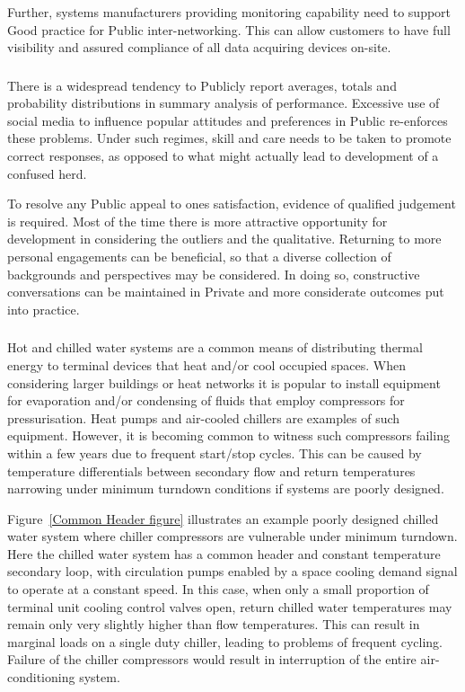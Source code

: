 \documentclass[11pt, oneside]{book}   	%
\begin{document}
Further, systems manufacturers providing monitoring capability need to support Good practice for Public inter-networking.
This can allow customers to have full visibility and assured compliance of all data acquiring devices on-site.\

\subsubsection{\color{Red}{P1: Social Media and Influencing the Averages}}
There is a widespread tendency to Publicly report averages, totals and probability distributions in summary analysis of performance.
Excessive use of social media to influence popular attitudes and preferences in Public re-enforces these problems.
Under such regimes, skill and care needs to be taken to promote correct responses, as opposed to what might actually lead to development of a confused herd.\

To resolve any Public appeal to ones satisfaction, evidence of qualified judgement is required.
Most of the time there is more attractive opportunity for development in considering the outliers and the qualitative.
Returning to more personal engagements can be beneficial, so that a diverse collection of backgrounds and perspectives may be considered.
In doing so, constructive conversations can be maintained in Private and more considerate outcomes put into practice.\

\subsubsection{\color{Red}{P1: Compressor Failures under Minimum Turndown}}
Hot and chilled water systems are a common means of distributing thermal energy to terminal devices that heat and/or cool occupied spaces.
When considering larger buildings or heat networks it is popular to install equipment for evaporation and/or condensing of fluids that employ compressors for pressurisation.
Heat pumps and air-cooled chillers are examples of such equipment.
However, it is becoming common to witness such compressors failing within a few years due to frequent start/stop cycles.
This can be caused by temperature differentials between secondary flow and return temperatures narrowing under minimum turndown conditions if systems are poorly designed.\

Figure~\ref{Common Header figure} illustrates an example poorly designed chilled water system where chiller compressors are vulnerable under minimum turndown.
Here the chilled water system has a common header and constant temperature secondary loop, with circulation pumps enabled by a space cooling demand signal to operate at a constant speed.
In this case, when only a small proportion of terminal unit cooling control valves open, return chilled water temperatures may remain only very slightly higher than flow temperatures.
This can result in marginal loads on a single duty chiller, leading to problems of frequent cycling.
Failure of the chiller compressors would result in interruption of the entire air-conditioning system.\
\end{document}
